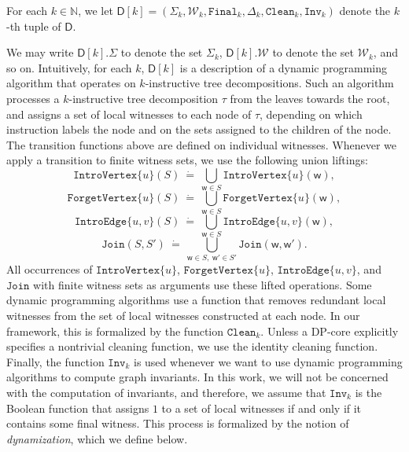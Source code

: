 \documentclass[11pt,a4paper]{article}
\newcommand{\treewidthvalue}{k}
\newcommand{\N}{\mathbb{N}}
\newcommand{\introvertexgeneric}[1]{\mathtt{IntroVertex}\{#1\}}
\newcommand{\introedgegeneric}[2]{\mathtt{IntroEdge}\{#1,#2\}}
\newcommand{\forgetvertexgeneric}[1]{\mathtt{ForgetVertex}\{#1\}}
\newcommand{\joingenericcore}{\mathtt{Join}}
\newcommand{\finalwitnessgenericcore}{\mathtt{Final}}
\newcommand{\cleaningfunctioncore}{\mathtt{Clean}}
\newcommand{\abstractdecomposition}{\tau}
\newcommand{\defeq}{~\dot{=}~}
\newcommand{\vertexone}{u}
\newcommand{\vertextwo}{v}
\newcommand{\allwitnesses}{\mathcal{W}}
\newcommand{\awitness}{\mathsf{w}}
\newcommand{\dpcore}{\mathsf{D}}
\newcommand{\invariantCore}{\mathtt{Inv}}
\newcommand{\alphabetclass}{\Sigma}
\newcommand{\transitionsdpcore}{\Delta}
\begin{document}
For each $\treewidthvalue\in \N$, we let
$\dpcore[\treewidthvalue]= (\alphabetclass_{\treewidthvalue},\allwitnesses_{\treewidthvalue},\finalwitnessgenericcore_{\treewidthvalue},
\transitionsdpcore_{\treewidthvalue},\cleaningfunctioncore_{\treewidthvalue}, \invariantCore_{\treewidthvalue})$
denote the
$\treewidthvalue$-th tuple of $\dpcore$.

We may write $\dpcore[\treewidthvalue].\alphabetclass$ to denote the set
$\alphabetclass_{\treewidthvalue}$, $\dpcore[\treewidthvalue].\allwitnesses$ to denote the set $\allwitnesses_{\treewidthvalue}$,
and so on.
Intuitively, for each $\treewidthvalue$, $\dpcore[\treewidthvalue]$ is a description of a dynamic programming algorithm that operates on $\treewidthvalue$-instructive tree decompositions. Such an algorithm processes a $\treewidthvalue$-instructive tree decomposition $\abstractdecomposition$ from the leaves
towards the root, and assigns a set of local witnesses to each node of $\abstractdecomposition$, depending on which instruction labels the node and on the sets assigned to the children of the node.
The transition functions above are defined on individual witnesses. Whenever we apply a transition to finite witness sets, we use the following union liftings:
\[
\introvertexgeneric{\vertexone}(S)\defeq \bigcup_{\awitness\in S}\introvertexgeneric{\vertexone}(\awitness),
\]
\[
\forgetvertexgeneric{\vertexone}(S)\defeq \bigcup_{\awitness\in S}\forgetvertexgeneric{\vertexone}(\awitness),
\]
\[
\introedgegeneric{\vertexone}{\vertextwo}(S)\defeq \bigcup_{\awitness\in S}\introedgegeneric{\vertexone}{\vertextwo}(\awitness),
\]
\[
\joingenericcore(S,S')\defeq \bigcup_{\awitness\in S,\;\awitness'\in S'}\joingenericcore(\awitness,\awitness').
\]
All occurrences of $\introvertexgeneric{\vertexone}$, $\forgetvertexgeneric{\vertexone}$, $\introedgegeneric{\vertexone}{\vertextwo}$, and $\joingenericcore$ with finite witness sets as arguments use these lifted operations.
Some dynamic programming algorithms use a function that removes redundant local witnesses from the set of local witnesses constructed at each node. In our framework, this is formalized by the
function $\cleaningfunctioncore_{\treewidthvalue}$. Unless a DP-core explicitly specifies a nontrivial cleaning function, we use the identity cleaning function.
Finally, the function $\invariantCore_{\treewidthvalue}$ is used whenever we want to use dynamic programming algorithms to compute graph invariants. In this work, we will not be concerned
with the computation of invariants, and therefore, we assume that
$\invariantCore_{\treewidthvalue}$ is the Boolean function that assigns $1$ to a set of local witnesses if and only if it contains some final witness.
This process is formalized by the notion of {\em dynamization}, which we define below.
\end{document}
